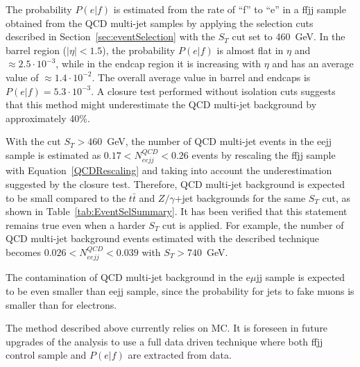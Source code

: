 The probability $P(e|f)$ is estimated from the rate of ``f'' to ``e'' in a ffjj sample obtained
from the QCD multi-jet samples by applying the selection cuts described in 
Section~\ref{sec:eventSelection} with the $S_T$ cut set to 460~GeV.
In the barrel region ($|\eta|<1.5$), the probability $P(e|f)$ is almost flat in $\eta$ and $\approx 2.5 \cdot 10^{-3}$,  
while in the endcap region it is increasing with $\eta$ and has an average value of $\approx 1.4 \cdot 10^{-2}$.
The overall average value in barrel and endcaps is $P(e|f) = 5.3 \cdot 10^{-3}$.
A closure test performed without isolation cuts suggests 
that this method might underestimate the 
QCD multi-jet background by approximately 40\%.


With the cut $S_T>460$~GeV, the number of QCD multi-jet events in the eejj sample is estimated as 
$0.17<N_{eejj}^{QCD}<0.26$ events by rescaling the ffjj sample 
with Equation~\ref{QCDRescaling} and 
taking into account the underestimation suggested by the closure test.
Therefore, QCD multi-jet background is expected to be small compared to 
the $t\bar{t}$ and $Z/\gamma$+jet backgrounds for the same $S_T$ cut, 
as shown in Table~\ref{tab:EventSelSummary}. 
It has been verified that this statement remains true even when a harder $S_T$ cut is applied.
For example, the number of QCD multi-jet background events estimated with the described technique
becomes $0.026<N_{eejj}^{QCD}<0.039$ with $S_T>740$~GeV.

The contamination of QCD multi-jet background in the e$\mu$jj sample 
is expected to be even smaller than eejj sample, since the probability for jets to fake muons 
is smaller than for electrons. %

The method described above currently relies on MC. 
It is foreseen in future upgrades of the analysis to use a full data driven technique where 
both ffjj control sample and $P(e|f)$ are extracted from data. 

%
